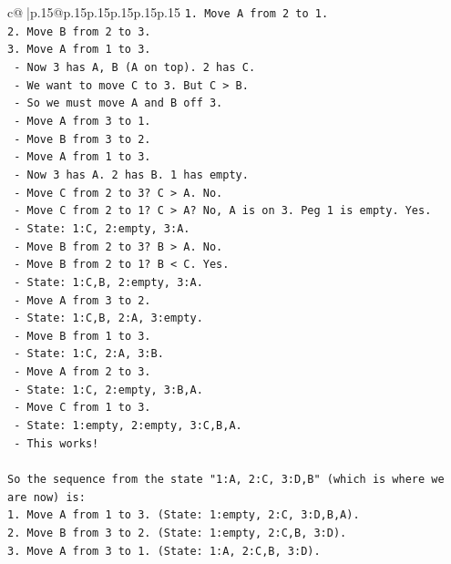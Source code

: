 \documentclass{article}
\begin{document}
{\begin{supertabular}{c@{$\;$}|p{.15\linewidth}@{}p{.15\linewidth}p{.15\linewidth}p{.15\linewidth}p{.15\linewidth}p{.15\linewidth}}
{{{\texttt{1. Move A from 2 to 1.} \\
\texttt{2. Move B from 2 to 3.} \\
\texttt{3. Move A from 1 to 3.} \\
\texttt{   {-} Now 3 has A, B (A on top). 2 has C.} \\
\texttt{   {-} We want to move C to 3. But C > B.} \\
\texttt{   {-} So we must move A and B off 3.} \\
\texttt{   {-} Move A from 3 to 1.} \\
\texttt{   {-} Move B from 3 to 2.} \\
\texttt{   {-} Move A from 1 to 3.} \\
\texttt{   {-} Now 3 has A. 2 has B. 1 has empty.} \\
\texttt{   {-} Move C from 2 to 3? C > A. No.} \\
\texttt{   {-} Move C from 2 to 1? C > A? No, A is on 3. Peg 1 is empty. Yes.} \\
\texttt{   {-} State: 1:C, 2:empty, 3:A.} \\
\texttt{   {-} Move B from 2 to 3? B > A. No.} \\
\texttt{   {-} Move B from 2 to 1? B < C. Yes.} \\
\texttt{   {-} State: 1:C,B, 2:empty, 3:A.} \\
\texttt{   {-} Move A from 3 to 2.} \\
\texttt{   {-} State: 1:C,B, 2:A, 3:empty.} \\
\texttt{   {-} Move B from 1 to 3.} \\
\texttt{   {-} State: 1:C, 2:A, 3:B.} \\
\texttt{   {-} Move A from 2 to 3.} \\
\texttt{   {-} State: 1:C, 2:empty, 3:B,A.} \\
\texttt{   {-} Move C from 1 to 3.} \\
\texttt{   {-} State: 1:empty, 2:empty, 3:C,B,A.} \\
\texttt{   {-} This works!} \\
\\ 
\texttt{So the sequence from the state "1:A, 2:C, 3:D,B" (which is where we are now) is:} \\
\texttt{1. Move A from 1 to 3. (State: 1:empty, 2:C, 3:D,B,A).} \\
\texttt{2. Move B from 3 to 2. (State: 1:empty, 2:C,B, 3:D).} \\
\texttt{3. Move A from 3 to 1. (State: 1:A, 2:C,B, 3:D).} \\
}}}
\end{supertabular}}
\end{document}
